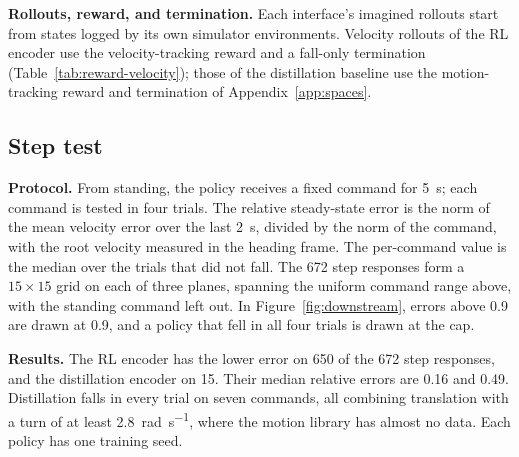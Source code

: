 \noindent\textbf{Rollouts, reward, and termination.} Each interface's imagined rollouts start from states logged by its own simulator environments. Velocity rollouts of the RL encoder use the velocity-tracking reward and a fall-only termination (Table~\ref{tab:reward-velocity}); those of the distillation baseline use the motion-tracking reward and termination of Appendix~\ref{app:spaces}.

\subsection{Step test}

\noindent\textbf{Protocol.} From standing, the policy receives a fixed command for \qty{5}{\second}; each command is tested in four trials. The relative steady-state error is the norm of the mean velocity error over the last \qty{2}{\second}, divided by the norm of the command, with the root velocity measured in the heading frame. The per-command value is the median over the trials that did not fall. The 672 step responses form a $15\times15$ grid on each of three planes, spanning the uniform command range above, with the standing command left out. In Figure~\ref{fig:downstream}, errors above 0.9 are drawn at 0.9, and a policy that fell in all four trials is drawn at the cap.

\noindent\textbf{Results.} The RL encoder has the lower error on 650 of the 672 step responses, and the distillation encoder on 15. Their median relative errors are 0.16 and 0.49. Distillation falls in every trial on seven commands, all combining translation with a turn of at least \qty{2.8}{\radian\per\second}, where the motion library has almost no data. Each policy has one training seed.
